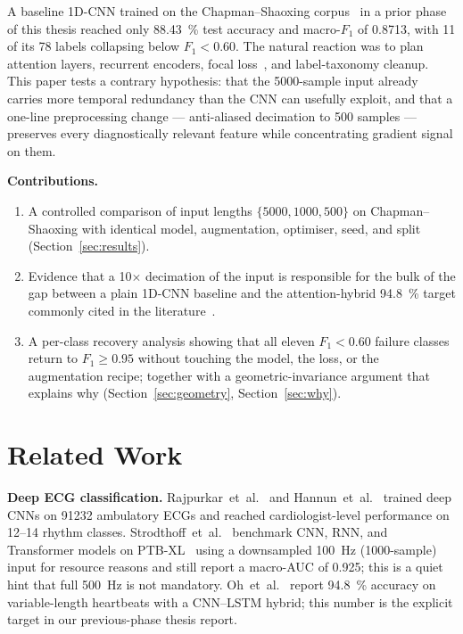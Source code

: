 \documentclass[conference]{IEEEtran}
\begin{document}
A baseline 1D-CNN trained on the Chapman--Shaoxing
corpus~\cite{zheng2020} in a prior phase of this thesis reached only
\SI{88.43}{\percent} test accuracy and macro-$F_1$ of \num{0.8713}, with
\num{11} of its \num{78} labels collapsing below $F_1 < 0.60$. The
natural reaction was to plan attention layers, recurrent encoders, focal
loss~\cite{lin2017}, and label-taxonomy cleanup. This paper tests a
contrary hypothesis: that the \num{5000}-sample input already carries
more temporal redundancy than the CNN can usefully exploit, and that a
one-line preprocessing change --- anti-aliased decimation to
\num{500} samples --- preserves every diagnostically relevant feature
while concentrating gradient signal on them.

\noindent\textbf{Contributions.}
\begin{enumerate}
  \item A controlled comparison of input lengths
        $\{\num{5000}, \num{1000}, \num{500}\}$ on Chapman--Shaoxing
        with identical model, augmentation, optimiser, seed, and split
        (Section~\ref{sec:results}).
  \item Evidence that a 10$\times$ decimation of the input is responsible
        for the bulk of the gap between a plain 1D-CNN baseline and the
        attention-hybrid \SI{94.8}{\percent} target commonly cited in the
        literature~\cite{oh2018}.
  \item A per-class recovery analysis showing that all eleven
        $F_1<0.60$ failure classes return to $F_1\geq 0.95$ without
        touching the model, the loss, or the augmentation recipe; together
        with a geometric-invariance argument that explains why
        (Section~\ref{sec:geometry}, Section~\ref{sec:why}).
\end{enumerate}

\section{Related Work}
\textbf{Deep ECG classification.}
Rajpurkar~et~al.~\cite{rajpurkar2017} and Hannun~et~al.~\cite{hannun2019}
trained deep CNNs on \num{91232} ambulatory ECGs and reached cardiologist-level
performance on \num{12}--\num{14} rhythm classes.
Strodthoff~et~al.~\cite{strodthoff2020} benchmark CNN, RNN, and Transformer
models on PTB-XL~\cite{wagner2020} using a downsampled \SI{100}{\hertz}
(\num{1000}-sample) input for resource reasons and still report a macro-AUC of
\num{0.925}; this is a quiet hint that full \SI{500}{\hertz} is not
mandatory.
Oh~et~al.~\cite{oh2018} report \SI{94.8}{\percent} accuracy on
variable-length heartbeats with a CNN--LSTM hybrid; this number is the
explicit target in our previous-phase thesis report.
\end{document}
